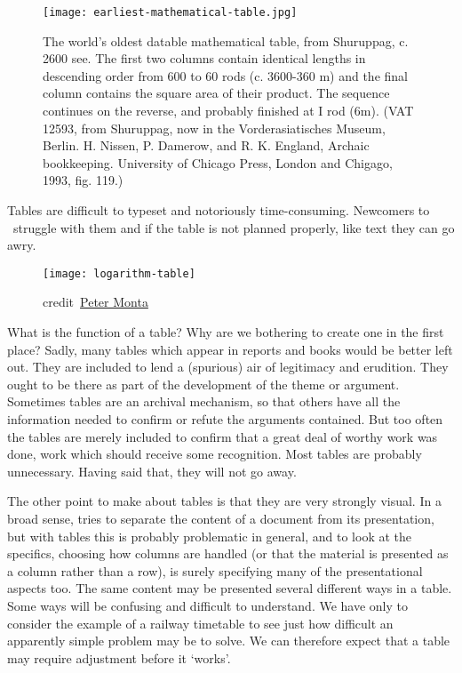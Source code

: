 \begin{figure}[tbp]
\centering 
\texttt{[image: earliest-mathematical-table.jpg]}

\caption{The world's oldest datable mathematical table, from Shuruppag, c. 2600 see.
The first two columns contain identical lengths in descending order from 600 to 60 rods
(c. 3600-360 m) and the final column contains the square area of their product. The sequence
continues on the reverse, and probably finished at I rod (6m). (VAT 12593, from Shuruppag,
now in the Vorderasiatisches Museum, Berlin. H. Nissen, P. Damerow, and R. K. England,
Archaic bookkeeping. University of Chicago Press, London and Chigago, 1993, fig. 119.)}
\label{tbl:sumeria}
\end{figure}

Tables are difficult to typeset and notoriously time-consuming. Newcomers to \latex\
struggle with them and if the table is not planned properly, like text they can go awry. 

\begin{figure}[htbp]

\texttt{[image: logarithm-table]}

\caption{  credit~\href{http://www.pmonta.com/tables/logarithmorum-chilias-prima/index.html}{Peter Monta}}
\end{figure}


  What is the function of a table?
Why are we bothering to create one in the first place?
Sadly, many tables which appear in reports and books would
be better left out. They are included to lend a (spurious) air
of legitimacy and erudition. They ought to be there as part
of the development of the theme or argument. Sometimes
tables are an archival mechanism, so that others have all the
information needed to confirm or refute the arguments contained.
But too often the tables are merely included to confirm
that a great deal of worthy work was done, work which
should receive some recognition. Most tables are probably
unnecessary. Having said that, they will not go away.

The other point to make about tables is that they are very
strongly visual. In a broad sense, \latex tries to separate the
content of a document from its presentation, but with tables
this is probably problematic in general, and to look at the
specifics, choosing how columns are handled (or that the material
is presented as a column rather than a row), is surely
specifying many of the presentational aspects too. The same
content may be presented several different ways in a table.
Some ways will be confusing and difficult to understand. We
have only to consider the example of a railway timetable to
see just how difficult an apparently simple problem may be
to solve. We can therefore expect that a table may require
adjustment before it `works'.

